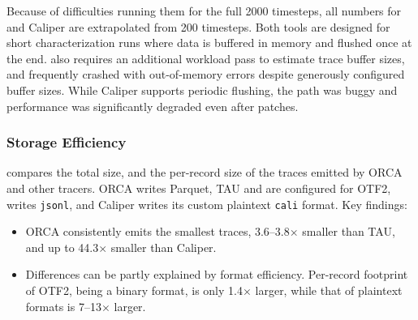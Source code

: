 Because of difficulties running them for the full 2000 timesteps, all numbers for \scorep{} and
Caliper are extrapolated from 200 timesteps.
Both tools are designed for short characterization runs where data is buffered in memory and
flushed once at the end.
\scorep{} also requires an additional workload pass to estimate trace buffer sizes, and
frequently crashed with out-of-memory errors despite generously configured buffer sizes.
While Caliper supports periodic flushing, the path was buggy and performance was significantly
degraded even after patches.

\subsubsection{Storage Efficiency}\label{sec:orca:eval-trace-size}

\figEvalSizeOnly{}
 compares the total size, and the per-record size of the traces emitted
by ORCA and other tracers.
ORCA writes Parquet, TAU and \scorep{} are configured for OTF2, \dftracer{} writes \texttt{jsonl},
and Caliper writes its custom plaintext \texttt{cali} format.
Key findings:


\begin{itemize}[leftmargin=*]
  \item ORCA consistently emits the smallest traces, 3.6--3.8$\times$ smaller than TAU, and up
        to 44.3$\times$ smaller than Caliper.
  \item Differences can be partly explained by format efficiency.
        Per-record footprint of OTF2, being a binary format, is only 1.4$\times$ larger, while that of
        plaintext formats is 7--13$\times$ larger.
\end{itemize}

